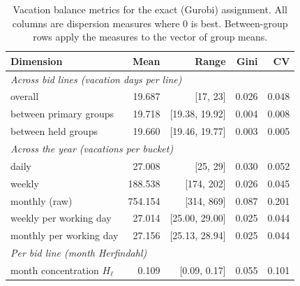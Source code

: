 \documentclass[preprint,12pt]{elsarticle}
\begin{document}
      \begin{table}[t]
         \centering
         \caption{Vacation balance metrics for the exact (Gurobi) assignment. All columns are dispersion measures where $0$ is best. Between-group rows apply the measures to the vector of group means.}
         \label{tab:balance}
         \begin{tabular}{lrrrr}
         \toprule
         Dimension & Mean & Range & Gini & CV \\
         \midrule
         \multicolumn{5}{l}{\emph{Across bid lines (vacation days per line)}}\\
         \quad overall                     & 19.687 & [17, 23] & 0.026 & 0.048 \\
         \quad between primary groups      & 19.718 & [19.38, 19.92] & 0.004 & 0.008 \\
         \quad between held groups         & 19.660 & [19.46, 19.77] & 0.003 & 0.005 \\
         \multicolumn{5}{l}{\emph{Across the year (vacations per bucket)}}\\
         \quad daily                       & 27.008 & [25, 29] & 0.030 & 0.052 \\
         \quad weekly                      & 188.538 & [174, 202] & 0.026 & 0.045 \\
         \quad monthly (raw)               & 754.154 & [314, 869] & 0.087 & 0.201 \\
         \quad weekly per working day      & 27.014 & [25.00, 29.00] & 0.025 & 0.044 \\
         \quad monthly per working day     & 27.156 & [25.13, 28.94] & 0.025 & 0.044 \\
         \multicolumn{5}{l}{\emph{Per bid line (month Herfindahl)}}\\
         \quad month concentration $H_\ell$ & 0.109 & [0.09, 0.17] & 0.055 & 0.101 \\
         \bottomrule
         \end{tabular}
      \end{table}
\end{document}

